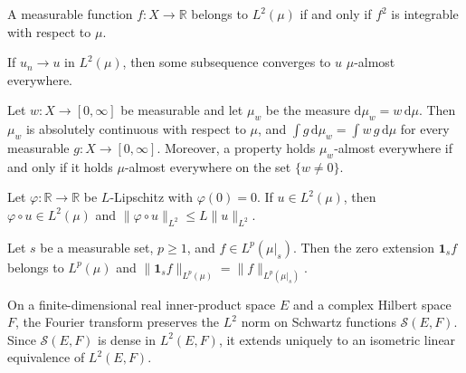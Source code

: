 \begin{theorem}\label{thm:std_L2_sq_integrable}
\mathlibok
A measurable function $f : X \to \mathbb{R}$ belongs to $L^2(\mu)$ if and only if $f^2$ is integrable with respect to $\mu$.
\end{theorem}

\begin{theorem}\label{thm:std_L2_subsequence}
\mathlibok
If $u_n \to u$ in $L^2(\mu)$, then some subsequence converges to $u$ $\mu$-almost everywhere.
\end{theorem}

\begin{theorem}\label{thm:std_withdensity}
\mathlibok
Let $w : X \to [0, \infty]$ be measurable and let $\mu_w$ be the measure $\mathrm{d}\mu_w = w \, \mathrm{d}\mu$. Then $\mu_w$ is absolutely continuous with respect to $\mu$, and $\int g \, \mathrm{d}\mu_w = \int w\, g \, \mathrm{d}\mu$ for every measurable $g : X \to [0, \infty]$. Moreover, a property holds $\mu_w$-almost everywhere if and only if it holds $\mu$-almost everywhere on the set $\{w \ne 0\}$.
\end{theorem}

\begin{theorem}\label{thm:std_lipschitz_L2}
\mathlibok
Let $\varphi : \mathbb{R} \to \mathbb{R}$ be $L$-Lipschitz with $\varphi(0) = 0$. If $u \in L^2(\mu)$, then $\varphi \circ u \in L^2(\mu)$ and $\lVert \varphi \circ u \rVert_{L^2} \le L \lVert u \rVert_{L^2}$.
\end{theorem}

\begin{theorem}\label{thm:std_indicator_Lp}
\mathlibok
Let $s$ be a measurable set, $p \ge 1$, and $f \in L^p(\mu|_s)$. Then the zero extension $\mathbf{1}_s f$ belongs to $L^p(\mu)$ and $\lVert \mathbf{1}_s f \rVert_{L^p(\mu)} = \lVert f \rVert_{L^p(\mu|_s)}$.
\end{theorem}

\begin{theorem}[Plancherel]\label{thm:std_fourier_L2}
\mathlibok
On a finite-dimensional real inner-product space $E$ and a complex Hilbert space $F$, the Fourier transform preserves the $L^2$ norm on Schwartz functions $\mathcal{S}(E, F)$. Since $\mathcal{S}(E, F)$ is dense in $L^2(E, F)$, it extends uniquely to an isometric linear equivalence of $L^2(E, F)$.
\end{theorem}

